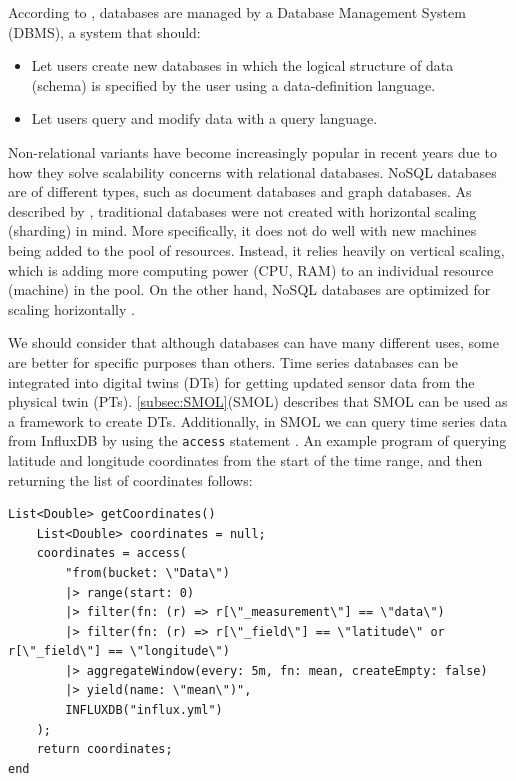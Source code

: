 \documentclass{article}
\begin{document}
According to \citeauthor{garcia-molina_database_2002}, databases are managed by a Database Management System (DBMS), a system that should:
\begin{itemize}
    \item Let users create new databases in which the logical structure of data (schema) is specified by the user using a data-definition language.
    \item Let users query and modify data with a query language.
\end{itemize}

Non-relational variants have become increasingly popular in recent years due to how they solve scalability concerns with relational databases. NoSQL databases are of different types, such as document databases and graph databases. As described by \citeauthor{mohamed_relational_2014}, traditional databases were not created with horizontal scaling (sharding) in mind. More specifically, it does not do well with new machines being added to the pool of resources. Instead, it relies heavily on vertical scaling, which is adding more computing power (CPU, RAM) to an individual resource (machine) in the pool. On the other hand, NoSQL databases are optimized for scaling horizontally \cite{mohamed_relational_2014, kim_geoycsb_2023}.

We should consider that although databases can have many different uses, some are better for specific purposes than others. Time series databases can be integrated into digital twins (DTs) for getting updated sensor data from the physical twin (PTs). \ref{subsec:SMOL}(SMOL) describes that SMOL can be used as a framework to create DTs. Additionally, in SMOL we can query time series data from InfluxDB by using the \verb|access| statement \cite{noauthor_time_nodate}. An example program of querying latitude and longitude coordinates from the start of the time range, and then returning the list of coordinates follows:

    \begin{Verbatim}[frame=single,breaklines=true]
List<Double> getCoordinates()
    List<Double> coordinates = null;
    coordinates = access(
        "from(bucket: \"Data\")
        |> range(start: 0)
        |> filter(fn: (r) => r[\"_measurement\"] == \"data\")
        |> filter(fn: (r) => r[\"_field\"] == \"latitude\" or r[\"_field\"] == \"longitude\")
        |> aggregateWindow(every: 5m, fn: mean, createEmpty: false)
        |> yield(name: \"mean\")",
        INFLUXDB("influx.yml")
    );
    return coordinates;
end
    \end{Verbatim}
\end{document}
